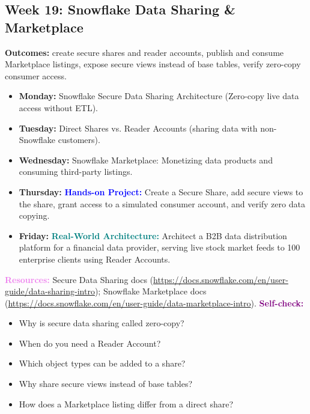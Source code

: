 \documentclass[11pt, a4paper]{article}
\newcommand{\project}[1]{\textbf{\textcolor{blue}{Hands-on Project:}} #1}
\newcommand{\usecase}[1]{\textbf{\textcolor{teal}{Real-World Architecture:}} #1}
\newcommand{\dayitem}[2]{\item \textbf{#1:} #2}
\newcommand{\resources}[1]{\vspace{1mm}\noindent\textbf{\textcolor{violet}{Resources:}} #1}
\newcommand{\selfcheck}[1]{\vspace{1mm}\noindent\textbf{\textcolor{purple}{Self-check:}} #1}
\begin{document}
\subsection*{Week 19: Snowflake Data Sharing \& Marketplace}
\par\noindent\textbf{Outcomes:} create secure shares and reader accounts, publish and consume Marketplace listings, expose secure views instead of base tables, verify zero-copy consumer access.
\begin{itemize}[label=-]
    \dayitem{Monday}{Snowflake Secure Data Sharing Architecture (Zero-copy live data access without ETL).}
    \dayitem{Tuesday}{Direct Shares vs. Reader Accounts (sharing data with non-Snowflake customers).}
    \dayitem{Wednesday}{Snowflake Marketplace: Monetizing data products and consuming third-party listings.}
    \dayitem{Thursday}{\project{Create a Secure Share, add secure views to the share, grant access to a simulated consumer account, and verify zero data copying.}}
    \dayitem{Friday}{\usecase{Architect a B2B data distribution platform for a financial data provider, serving live stock market feeds to 100 enterprise clients using Reader Accounts.}}
\end{itemize}
\resources{Secure Data Sharing docs (\url{https://docs.snowflake.com/en/user-guide/data-sharing-intro}); Snowflake Marketplace docs (\url{https://docs.snowflake.com/en/user-guide/data-marketplace-intro}).}
\selfcheck{\begin{itemize}[label=-, nosep, leftmargin=4mm]
    \item Why is secure data sharing called zero-copy?
    \item When do you need a Reader Account?
    \item Which object types can be added to a share?
    \item Why share secure views instead of base tables?
    \item How does a Marketplace listing differ from a direct share?
\end{itemize}}
\end{document}
